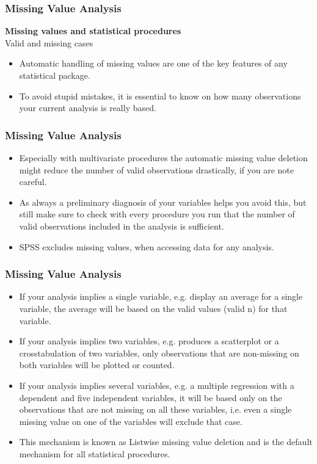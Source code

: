 \documentclass[MASTER.tex]{subfiles}
\begin{document}
 
\begin{frame}
	\frametitle{Missing Value Analysis}
\large

\noindent \textbf{Missing values and statistical procedures}\\
Valid and missing cases\\
\begin{itemize}
\item Automatic handling of missing values are one of the key features of any statistical package. 

\item To avoid stupid mistakes, it is essential to know on how many observations your current analysis is really based.
\end{itemize}
 \end{frame}
\begin{frame}
	\frametitle{Missing Value Analysis}
\large
\begin{itemize}
\item 
Especially with multivariate procedures the automatic missing value deletion might reduce the number of valid observations drastically, if you are note careful. 
\item As always a preliminary diagnosis of your variables helps you avoid this, but still make sure to check with every procedure you run that the number of valid observations included in the analysis is sufficient.

\item SPSS excludes missing values, when accessing data for any analysis.
\end{itemize}
\end{frame}
\begin{frame}
	\frametitle{Missing Value Analysis}
	
\begin{itemize}
\item If your analysis implies a single variable, e.g. display an average for a single variable, the average will be based on the valid values (valid n) for that variable.
\item If your analysis implies two variables, e.g. produces a scatterplot or a crosstabulation of two variables, only observations that are non-missing on both variables will be plotted or counted.
\item If your analysis implies several variables, e.g. a multiple regression with a dependent and five independent variables, it will be based only on the observations that are not missing on all these variables, i.e. even a single missing value on one of the variables will exclude that case.
\item This mechanism is known as Listwise missing value deletion and is the default mechanism for all statistical procedures. 
\end{itemize}

\end{frame}
\end{document}
